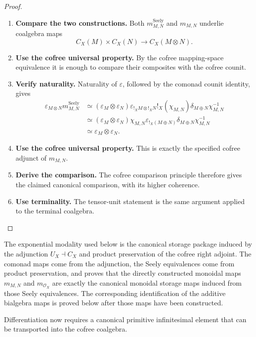 \begin{proof}
\leavevmode
\begin{enumerate}[label=\textup{(\arabic*)}]
    \item \textbf{Compare the two constructions.}
    Both \(m^{\mathrm{Seely}}_{M,N}\) and \(m_{M,N}\) underlie coalgebra maps
    \[
        C_X(M)\times C_X(N)\longrightarrow C_X(M\otimes N).
    \]

    \item \textbf{Use the cofree universal property.}
    By the cofree mapping-space equivalence it is enough to compare their composites with the
    cofree counit.

    \item \textbf{Verify naturality.}
    Naturality of \(\varepsilon\), followed by the comonad counit identity, gives
    \[
    \begin{aligned}
        \varepsilon_{M\otimes N}m^{\mathrm{Seely}}_{M,N}
        &\simeq
        (\varepsilon_M\otimes\varepsilon_N)
        \varepsilon_{!_XM\otimes !_XN}
        !_X(\chi_{M,N})
        \delta_{M\oplus N}
        \chi^{-1}_{M,N}
        \\
        &\simeq
        (\varepsilon_M\otimes\varepsilon_N)
        \chi_{M,N}
        \varepsilon_{!_X(M\oplus N)}
        \delta_{M\oplus N}
        \chi^{-1}_{M,N}
        \\
        &\simeq
        \varepsilon_M\otimes\varepsilon_N.
    \end{aligned}
    \]

    \item \textbf{Use the cofree universal property.}
    This is exactly the specified cofree adjunct of \(m_{M,N}\).

    \item \textbf{Derive the comparison.}
    The cofree comparison principle therefore gives the claimed canonical comparison, with its
    higher coherence.

    \item \textbf{Use terminality.}
    The tensor-unit statement is the same argument applied to the terminal coalgebra.
\end{enumerate}
\end{proof}

\begin{remark}
\label{rem:tangent-storage-constructed}
The exponential modality used below is the canonical storage package induced
by the adjunction \(U_X\dashv C_X\) and product preservation of the cofree
right adjoint. The comonad maps come from the adjunction, the Seely
equivalences come from product preservation, and
 proves that the directly constructed
monoidal maps \(m_{M,N}\) and \(m_{\mathcal O_X}\) are exactly the
canonical monoidal storage maps induced from those Seely equivalences. The
corresponding identification of the additive bialgebra maps is proved below
after those maps have been constructed.
\end{remark}
Differentiation now requires a canonical primitive infinitesimal element that
can be transported into the cofree coalgebra.

